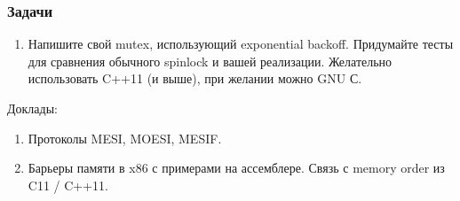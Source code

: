 \documentclass[aspectratio=169, pdf, 8pt, unicode]{beamer}
\begin{document}
\begin{frame}
\frametitle{Задачи}
\begin{enumerate}
\item Напишите свой mutex, использующий exponential backoff. Придумайте тесты для сравнения обычного spinlock и вашей реализации.
   Желательно использовать C++11 (и выше), при желании можно GNU С.
\end{enumerate}

Доклады:
\begin{enumerate}
\item Протоколы MESI, MOESI, MESIF.
\item Барьеры памяти в x86 с примерами на ассемблере. Связь с memory order из C11 / C++11.
\end{enumerate}

\end{frame}
\end{document}

